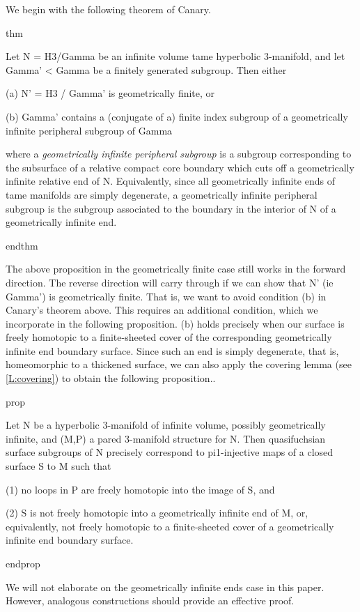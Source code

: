 We begin with the following theorem of Canary.

thm

Let N = H3/Gamma be an infinite volume tame hyperbolic 3-manifold, and let
Gamma' < Gamma be a finitely generated subgroup. Then either

(a) N' = H3 / Gamma' is geometrically finite, or

(b) Gamma' contains a (conjugate of a) finite index subgroup of a geometrically
infinite peripheral subgroup of Gamma

where a \emph{geometrically infinite peripheral subgroup} is a subgroup
corresponding to the subsurface of a relative compact core boundary which cuts
off a geometrically infinite relative end of N. Equivalently, since all
geometrically infinite ends of tame manifolds are simply degenerate,
a geometrically infinite peripheral subgroup is the subgroup associated to the
boundary in the interior of N of a geometrically infinite end.

endthm

The above proposition in the geometrically finite case still works in the
forward direction. The reverse direction will carry through if we can show that
N' (ie Gamma') is geometrically finite. That is, we want to avoid condition (b)
in Canary's theorem above. This requires an additional condition, which we
incorporate in the following proposition. (b) holds precisely when our surface
is freely homotopic to a finite-sheeted cover of the corresponding
geometrically infinite end boundary surface. Since such an end is simply
degenerate, that is, homeomorphic to a thickened surface, we can also apply the
covering lemma (see \ref{L:covering}) to obtain the following proposition..

prop

Let N be a hyperbolic 3-manifold of infinite volume, possibly geometrically
infinite, and (M,P) a pared 3-manifold structure for N. Then quasifuchsian
surface subgroups of N precisely correspond to pi1-injective maps of a closed
surface S to M such that

(1) no loops in P are freely homotopic into the image of S, and

(2) S is not freely homotopic into a geometrically infinite end of M, or,
equivalently, not freely homotopic to a finite-sheeted cover of a geometrically
infinite end boundary surface.

endprop

We will not elaborate on the geometrically infinite ends case in this paper.
However, analogous constructions should provide an effective proof.

